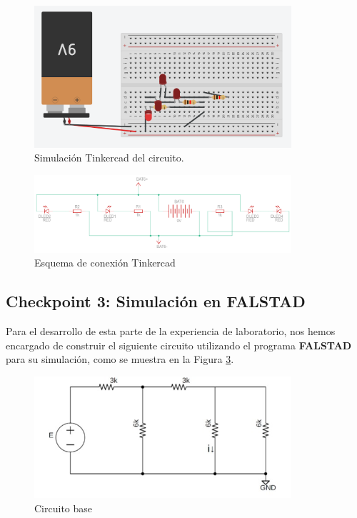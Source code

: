 \documentclass{article}
\begin{document}
\begin{figure}[H]
    \centering
    \includegraphics[width=0.85\textwidth]{./img/ckpt_2_3_1.png}
    \caption{Simulación Tinkercad del circuito.}
    \label{fig:simulacion_implementacion}
\end{figure}


\begin{figure}[H]
    \centering
    \includegraphics[width=0.85\textwidth]{./img/ckpt_2_3_2.png}
    \caption{Esquema de conexión Tinkercad}
    \label{fig:simulacion_esquema1}
\end{figure}

\subsection{Checkpoint 3: Simulación en FALSTAD}
Para el desarrollo de esta parte de la experiencia de laboratorio, nos hemos encargado de construir el siguiente circuito utilizando el programa \textbf{FALSTAD} para su simulación, como se muestra en la Figura \ref{fig:simulacion_esquema2}.

\begin{figure}[H]
    \centering
    \includegraphics[width=0.85\textwidth]{./img/Circuito-3.jpeg}
    \caption{Circuito base}
    \label{fig:simulacion_esquema2}
\end{figure}
\end{document}

